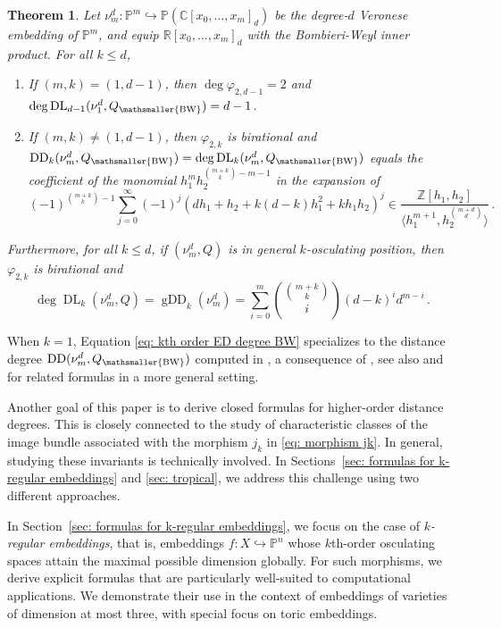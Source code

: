 \documentclass[11pt,reqno]{amsart}
\numberwithin{equation}{section}
\theoremstyle{plain}
\newtheorem{theorem}{Theorem}
\numberwithin{theorem}{section}
\theoremstyle{definition}
\renewcommand{\P}{\mathbb{P}}
\newcommand{\Z}{\mathbb{Z}}
\newcommand{\R}{\mathbb{R}}
\newcommand{\C}{\mathbb{C}}
\newcommand{\DL}{\operatorname{DL}}
\newcommand{\DD}{\operatorname{DD}}
\newcommand{\gDD}{\operatorname{gDD}}
\newcommand{\mBW}{\mathsmaller{\mathrm{BW}}}
\begin{document}
\begin{theorem}\label{thm: projection data locus Veronese BW is either birational or of degree 2}
Let $\nu_m^d\colon\P^m\hookrightarrow\P(\C[x_0,\dots,x_m]_d)$ be the degree-$d$ Veronese embedding of $\P^m$, and equip $\R[x_0,\dots,x_m]_d$ with the Bombieri-Weyl inner product. For all $k\le d$,
\begin{enumerate}
    \item If $(m,k)=(1,d-1)$, then $\deg\varphi_{2,d-1}=2$ and $\deg\DL_{d-1}(\nu_1^d,Q_\mBW)=d-1$.
    \item If $(m,k)\neq (1,d-1)$, then $\varphi_{2,k}$ is birational and $\DD_k(\nu_m^d,Q_\mBW)=\deg\DL_k(\nu_m^d,Q_\mBW)$ equals the coefficient of the monomial $h_1^mh_2^{\binom{m+k}{k}-m-1}$ in the expansion of
    \begin{equation}\label{eq: kth order ED degree BW}
    (-1)^{\binom{m+k}{k}-1}\sum_{j=0}^\infty(-1)^j(dh_1+h_2+k(d-k)h_1^2+kh_1h_2)^j \in \frac{\Z[h_1,h_2]}{\langle h_1^{m+1},h_2^{\binom{m+d}{d}}\rangle}\,.
    \end{equation}
\end{enumerate}
Furthermore, for all $k\le d$, if $(\nu_m^d,Q)$ is in general $k$-osculating position, then $\varphi_{2,k}$ is birational and
\begin{equation}\label{eq: generic degree data locus Veronese}
\deg\DL_k(\nu_m^d,Q) = \gDD_k(\nu_m^d) = \sum_{i=0}^m \binom{\binom{m+k}{k}}{i}(d-k)^id^{m-i}\,.
\end{equation}
\end{theorem}

When $k=1$, Equation \eqref{eq: kth order ED degree BW} specializes to the distance degree $\DD(\nu_m^d,Q_\mBW)$ computed in \cite[Corollary 8.7]{DHOST}, a consequence of \cite[Theorem 5.6]{cartwright2013number}, see also \cite[Theorem 3.4]{oeding2013eigenvectors} and \cite[Theorem 12]{friedland2014number} for related formulas in a more general setting.

Another goal of this paper is to derive closed formulas for higher-order distance degrees. This is closely connected to the study of characteristic classes of the image bundle associated with the morphism $j_k$ in \eqref{eq: morphism jk}. In general, studying these invariants is technically involved. In Sections~\ref{sec: formulas for k-regular embeddings} and \ref{sec: tropical}, we address this challenge using two different approaches.

In Section~\ref{sec: formulas for k-regular embeddings}, we focus on the case of {\em $k$-regular embeddings}, that is, embeddings $f \colon X \hookrightarrow \P^n$ whose $k$th-order osculating spaces attain the maximal possible dimension globally. For such morphisms, we derive explicit formulas that are particularly well-suited to computational applications. We demonstrate their use in the context of embeddings of varieties of dimension at most three, with special focus on toric embeddings. 
\end{document}
